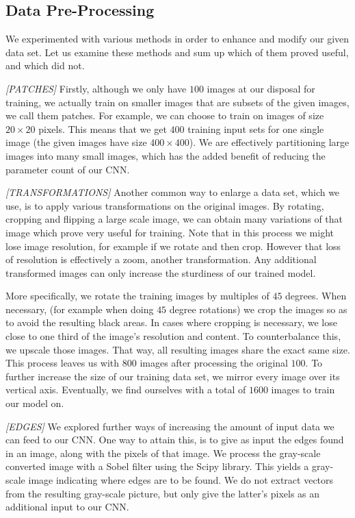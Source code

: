 \documentclass[10pt,conference,compsocconf]{IEEEtran}
\begin{document}
\subsection{Data Pre-Processing} 
\label{ssec:data_proc}

We experimented with various methods in order to enhance and modify our given data set. Let us examine these methods and sum up which of them proved useful, and which did not.

\textit{[PATCHES]}   
Firstly, although we only have $100$ images at our disposal for training, we actually train on smaller images that are subsets of the given images, we call them patches. For example, we can choose to train on images of size $20 \times 20$ pixels. This means that we get $400$ training input sets for one single image (the given images have size $400 \times 400$). We are effectively partitioning large images into many small images, which has the added benefit of reducing the parameter count of our CNN.

\textit{[TRANSFORMATIONS]}   
Another common way to enlarge a data set, which we use, is to apply various transformations on the original images. By rotating, cropping and flipping a large scale image, we can obtain many variations of that image which prove very useful for training. Note that in this process we might lose image resolution, for example if we rotate and then crop. However that loss of resolution is effectively a zoom, another transformation. Any additional transformed images can only increase the sturdiness of our trained model. 

More specifically, we rotate the training images by multiples of $45$ degrees. When necessary, (for example when doing $45$ degree rotations) we crop the images so as to avoid the resulting black areas. In cases where cropping is necessary, we lose close to one third of the image's resolution and content. To counterbalance this, we upscale those images. That way, all resulting images share the exact same size. This process leaves us with $800$ images after processing the original $100$. To further increase the size of our training data set, we mirror every image over its vertical axis. Eventually, we find ourselves with a total of $1600$ images to train our model on.

\textit{[EDGES]}   
We explored further ways of increasing the amount of input data we can feed to our CNN. One way to attain this, is to give as input the edges found in an image, along with the pixels of that image. We process the gray-scale converted image with a Sobel filter using the Scipy library. This yields a gray-scale image indicating where edges are to be found. We do not extract vectors from the resulting gray-scale picture, but only give the latter's pixels as an additional input to our CNN.
\end{document}
